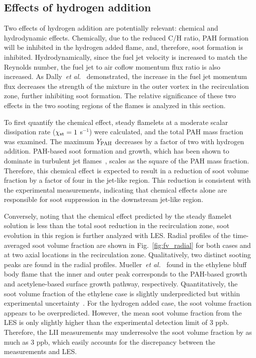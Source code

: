 \documentclass{essci}
\begin{document}
\subsection{Effects of hydrogen addition}

Two effects of hydrogen addition are potentially relevant: chemical and hydrodynamic effects.  Chemically, due to the reduced C/H ratio, PAH formation will be inhibited in the hydrogen added flame, and, therefore, soot formation is inhibited.  Hydrodynamically, since the fuel jet velocity is increased to match the Reynolds number, the fuel jet to air coflow momentum flux ratio is also increased.  As Dally~\emph{et al.}~\cite{dally98b} demonstrated, the increase in the fuel jet momentum flux decreases the strength of the mixture in the outer vortex in the recirculation zone, further inhibiting soot formation.  The relative significance of these two effects in the two sooting regions of the flames is analyzed in this section.

To first quantify the chemical effect, steady flamelets at a moderate scalar dissipation rate ($\chi_{\rm st} = 1$ s$^{-1}$) were calculated, and the total PAH mass fraction was examined.  The maximum $Y_{\rm PAH}$ decreases by a factor of two with hydrogen addition.  PAH-based soot formation and growth, which has been shown to dominate in turbulent jet flames~\cite{attili15,mueller13}, scales as the square of the PAH mass fraction.  Therefore, this chemical effect is expected to result in a reduction of soot volume fraction by a factor of four in the jet-like region.  This reduction is consistent with the experimental measurements, indicating that chemical effects alone are responsible for soot suppression in the downstream jet-like region.

Conversely, noting that the chemical effect predicted by the steady flamelet solution is less than the total soot reduction in the recirculation zone, soot evolution in this region is further analyzed with LES.  Radial profiles of the time-averaged soot volume fraction are shown in Fig.~\ref{fig:fv_radial} for both cases and at two axial locations in the recirculation zone.  Qualitatively, two distinct sooting peaks are found in the radial profiles.  Mueller~\emph{et al.}~\cite{mueller13} found in the ethylene bluff body flame that the inner and outer peak corresponds to the PAH-based growth and acetylene-based surface growth pathway, respectively.  Quantitatively, the soot volume fraction of the ethylene case is slightly underpredicted but within experimental uncertainty~\cite{mueller13}.  For the hydrogen added case, the soot volume fraction appears to be overpredicted.  However, the mean soot volume fraction from the LES is only slightly higher than the experimental detection limit of 3 ppb.  Therefore, the LII measurements may underresolve the soot volume fraction by as much as 3 ppb, which easily accounts for the discrepancy between the measurements and LES.
\end{document}
